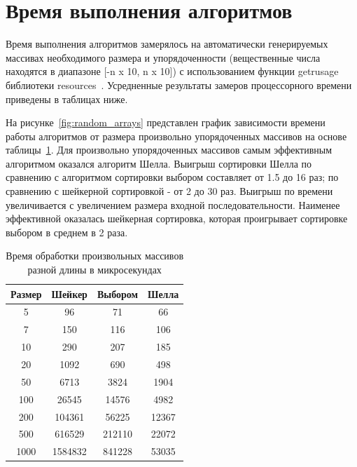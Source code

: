 \documentclass[12pt]{report}
\begin{document}
    \section{Время выполнения алгоритмов}
    Время выполнения алгоритмов замерялось на автоматически генерируемых массивах необходимого размера
    и упорядоченности (вещественные числа находятся в диапазоне [-n x 10, n x 10]) с использованием функции
    getrusage библиотеки resources~\cite{resource}.
    Усредненные результаты замеров процессорного времени приведены в таблицах ниже.

    На рисунке~\ref{fig:random_arrays} представлен график зависимости времени работы алгоритмов
    от размера произвольно упорядоченных массивов на основе таблицы~\ref{tab:rand_time}.
    Для произвольно упорядоченных массивов самым эффективным алгоритмом оказался алгоритм Шелла.
    Выигрыш сортировки Шелла по сравнению с алгоритмом сортировки выбором составляет от 1.5 до 16 раз;
    по сравнению с шейкерной сортировкой - от 2 до 30 раз.
    Выигрыш по времени увеличивается с увеличением размера входной последовательности.
    Наименее эффективной оказалась шейкерная сортировка, которая проигрывает сортировке выбором в среднем в 2 раза.
    \begin{table}[H]
        \begin{center}
            \captionsetup{justification=raggedright, singlelinecheck=false}
            \caption{\label{tab:rand_time} Время обработки произвольных массивов разной длины в микросекундах}
            \begin{tabular}{|c c c c|}
                \hline
                Размер & Шейкер  & Выбором & Шелла\\ [0.5ex]
                \hline
                5      & 96      & 71      & 66    \\
                \hline
                7      & 150     & 116     & 106   \\
                \hline
                10     & 290     & 207     & 185   \\
                \hline
                20     & 1092    & 690     & 498   \\
                \hline
                50     & 6713    & 3824    & 1904  \\
                \hline
                100    & 26545   & 14576   & 4982  \\
                \hline
                200    & 104361  & 56225   & 12367 \\
                \hline
                500    & 616529  & 212110  & 22072 \\
                \hline
                1000   & 1584832 & 841228  & 53035 \\
                \hline
            \end{tabular}
        \end{center}
    \end{table}
\end{document}

